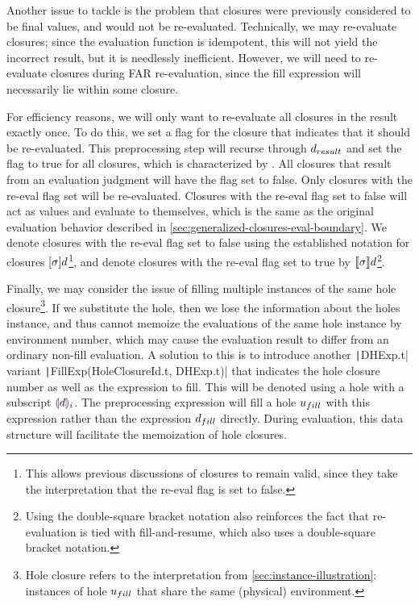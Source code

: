 Another issue to tackle is the problem that closures were previously considered to be final values, and would not be re-evaluated. Technically, we may re-evaluate closures; since the evaluation function is idempotent, this will not yield the incorrect result, but it is needlessly inefficient. However, we will need to re-evaluate closures during FAR re-evaluation, since the fill expression will necessarily lie within some closure.

For efficiency reasons, we will only want to re-evaluate all closures in the result exactly once. To do this, we set a flag for the closure that indicates that it should be re-evaluated. This preprocessing step will recurse through $d_{result}$ and set the flag to true for all closures, which is characterized by . All closures that result from an evaluation judgment will have the flag set to false. Only closures with the re-eval flag set will be re-evaluated. Closures with the re-eval flag set to false will act as values and evaluate to themselves, which is the same as the original evaluation behavior described in \cref{sec:generalized-closures-eval-boundary}. We denote closures with the re-eval flag set to false using the established notation for closures $[\sigma]d$\footnote{This allows previous discussions of closures to remain valid, since they take the interpretation that the re-eval flag is set to false.}, and denote closures with the re-eval flag set to true by $\llbracket\sigma\rrbracket d$\footnote{Using the double-square bracket notation also reinforces the fact that re-evaluation is tied with fill-and-resume, which also uses a double-square bracket notation.}.

Finally, we may consider the issue of filling multiple instances of the same hole closure\footnote{Hole closure refers to the interpretation from \cref{sec:instance-illustration}: instances of hole $u_{fill}$ that share the same (physical) environment.}. If we substitute the hole, then we lose the information about the holes instance, and thus cannot memoize the evaluations of the same hole instance by environment number, which may cause the evaluation result to differ from an ordinary non-fill evaluation. A solution to this is to introduce another \texttt|DHExp.t| variant \texttt|FillExp(HoleClosureId.t, DHExp.t)| that indicates the hole closure number as well as the expression to fill. This will be denoted using a hole with a subscript $\textcolor{violet}{\llparenthesis} d\textcolor{violet}{\rrparenthesis}_i$. The preprocessing expression will fill a hole $u_{fill}$ with this expression rather than the expression $d_{fill}$ directly. During evaluation, this data structure will facilitate the memoization of hole closures.

